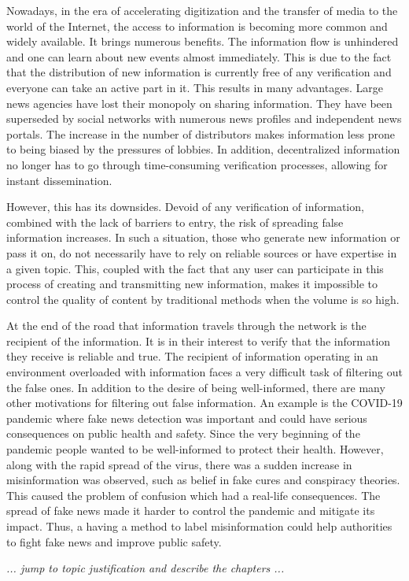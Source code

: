 Nowadays, in the era of accelerating digitization and the transfer of media to the world of the Internet, the access to information is becoming more common and widely available. It brings numerous benefits. The information flow is unhindered and one can learn about new events almost immediately. This is due to the fact that the distribution of new information is currently free of any verification and everyone can take an active part in it. This results in many advantages. Large news agencies have lost their monopoly on sharing information. They have been superseded by social networks with numerous news profiles and independent news portals. The increase in the number of distributors makes information less prone to being biased by the pressures of lobbies. In addition, decentralized information no longer has to go through time-consuming verification processes, allowing for instant dissemination.

However, this has its downsides. Devoid of any verification of information, combined with the lack of barriers to entry, the risk of spreading false information increases. In such a situation, those who generate new information or pass it on, do not necessarily have to rely on reliable sources or have expertise in a given topic. This, coupled with the fact that any user can participate in this process of creating and transmitting new information, makes it impossible to control the quality of content by traditional methods when the volume is so high.

At the end of the road that information travels through the network is the recipient of the information. It is in their interest to verify that the information they receive is reliable and true. The recipient of information operating in an environment overloaded with information faces a very difficult task of filtering out the false ones. In addition to the desire of being well-informed, there are many other motivations for filtering out false information. An example is the COVID-19 pandemic where fake news detection was important and could have serious consequences on public health and safety. Since the very beginning of the pandemic people wanted to be well-informed to protect their health. However, along with the rapid spread of the virus, there was a sudden increase in misinformation was observed, such as belief in fake cures and conspiracy theories. This caused the problem of confusion which had a real-life consequences. The spread of fake news made it harder to control the pandemic and mitigate its impact. Thus, a having a method to label misinformation could help authorities to fight fake news and improve public safety.

\textit{... jump to topic justification and describe the chapters ...}